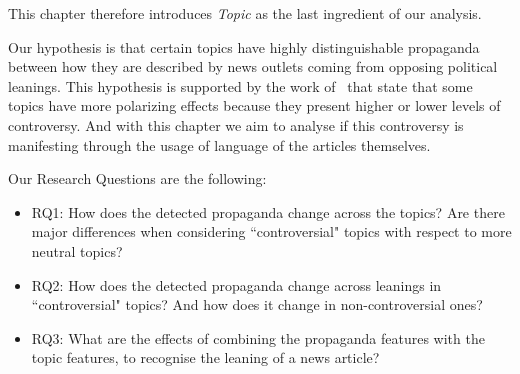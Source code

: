 This chapter therefore introduces \emph{Topic} as the last ingredient of our analysis.

Our hypothesis is that certain topics have highly distinguishable propaganda between how they are described by news outlets coming from opposing political leanings.
This hypothesis is supported by the work of~\cite{garimella2018quantifying,treuillier2022being} that state that some topics have more polarizing effects because they present higher or lower levels of controversy.
And with this chapter we aim to analyse if this controversy is manifesting through the usage of language of the articles themselves.







Our Research Questions are the following: 
\begin{itemize}
    \item RQ1: How does the detected propaganda change across the topics? Are there major differences when considering ``controversial" topics with respect to more neutral topics?
    \item RQ2: How does the detected propaganda change across leanings in ``controversial" topics? And how does it change in non-controversial ones?
    \item RQ3: What are the effects of combining the propaganda features with the topic features, to recognise the leaning of a news article?
\end{itemize}


